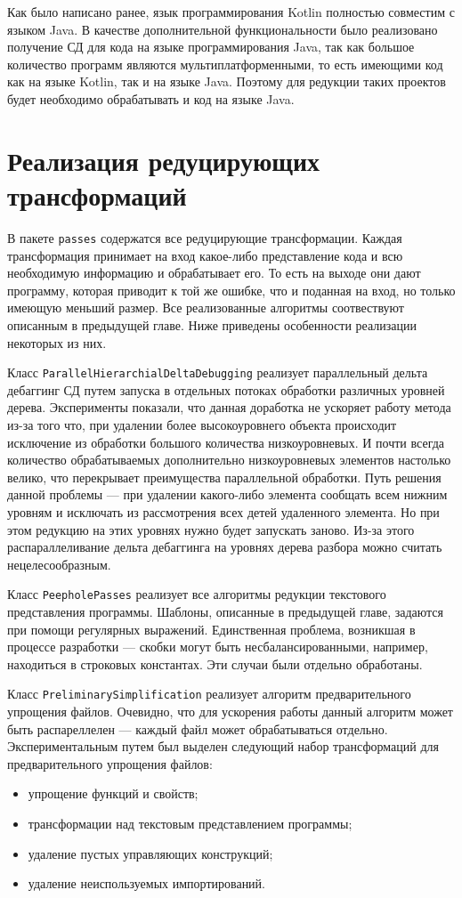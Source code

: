 Как было написано ранее, язык программирования Kotlin полностью совместим с языком Java. В качестве дополнительной функциональности было реализовано получение СД для кода на языке программирования Java, так как большое количество программ являются мультиплатформенными, то есть имеющими код как на языке Kotlin, так и на языке Java. Поэтому для редукции таких проектов будет необходимо обрабатывать и код на языке Java. 

\section{Реализация редуцирующих трансформаций}
В пакете \texttt{passes} содержатся все редуцирующие трансформации. Каждая трансформация принимает на вход какое-либо представление кода и всю необходимую информацию и обрабатывает его. То есть на выходе они дают программу, которая приводит к той же ошибке, что и поданная на вход, но только имеющую меньший размер. Все реализованные алгоритмы соотвествуют описанным в предыдущей главе. Ниже приведены особенности реализации некоторых из них.

Класс \texttt{ParallelHierarchialDeltaDebugging} реализует параллельный дельта дебаггинг СД путем запуска в отдельных потоках обработки различных уровней дерева. Эксперименты показали, что данная доработка не ускоряет работу метода из-за того что, при удалении более высокоуровнего объекта происходит исключение из обработки большого количества низкоуровневых. И почти всегда количество обрабатываемых дополнительно низкоуровневых элементов настолько велико, что перекрывает преимущества параллельной обработки. Путь решения данной проблемы --- при удалении какого-либо элемента сообщать всем нижним уровням и исключать из рассмотрения всех детей удаленного элемента. Но при этом редукцию на этих уровнях нужно будет запускать заново. Из-за этого распараллеливание дельта дебаггинга на уровнях дерева разбора можно считать нецелесообразным. 

Класс \texttt{PeepholePasses} реализует все алгоритмы редукции текстового представления программы. Шаблоны, описанные в предыдущей главе, задаются при помощи регулярных выражений. Единственная проблема, возникшая в процессе разработки --- скобки могут быть несбалансированными, например, находиться в строковых константах. Эти случаи были отдельно обработаны.

Класс \texttt{PreliminarySimplification} реализует алгоритм предварительного упрощения файлов. Очевидно, что для ускорения работы данный алгоритм может быть распареллелен --- каждый файл может обрабатываться отдельно. Экспериментальным путем был выделен следующий набор трансформаций для предварительного упрощения файлов:
\begin{itemize}
	\item упрощение функций и свойств;
	\item трансформации над текстовым представлением программы;
	\item удаление пустых управляющих конструкций;
	\item удаление неиспользуемых импортирований.
\end{itemize}


